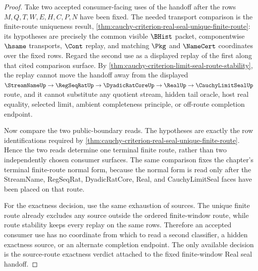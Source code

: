\begin{proof}
Take two accepted consumer-facing uses of the handoff after the rows
$M,Q,T,W,E,H,C,P,N$ have been fixed. The needed transport comparison is the
finite-route uniqueness result, \autoref{thm:cauchy-criterion-real-seal-unique-finite-route}: its hypotheses are precisely the common visible $\BHist$ packet,
componentwise $\hsame$ transports, $\Cont$ replay, and matching $\Pkg$ and
$\NameCert$ coordinates over the fixed rows. Regard the second use as a
displayed replay of the first along that cited comparison surface. By
\autoref{thm:cauchy-criterion-limit-seal-route-stability}, the replay cannot
move the handoff away from the displayed
$\StreamNameUp \to \RegSeqRatUp \to \DyadicRatCoreUp \to \RealUp \to
\CauchyLimitSealUp$ route, and it cannot substitute any quotient stream,
hidden tail oracle, host real equality, selected limit, ambient completeness
principle, or off-route completion endpoint.

Now compare the two public-boundary reads. The hypotheses are exactly the row
identifications required by
\autoref{thm:cauchy-criterion-real-seal-unique-finite-route}. Hence the two
reads determine one terminal finite route, rather than two independently chosen
consumer surfaces. The same comparison fixes the chapter's terminal
finite-route normal form, because the normal form is read only after the
StreamName, RegSeqRat, DyadicRatCore, Real, and CauchyLimitSeal faces have been
placed on that route.

For the exactness decision, use the same exhaustion of sources. The unique
finite route already excludes any source outside the ordered finite-window
route, while route stability keeps every replay on the same rows. Therefore an
accepted consumer use has no coordinate from which to read a second classifier,
a hidden exactness source, or an alternate completion endpoint. The only
available decision is the source-route exactness verdict attached to the fixed
finite-window Real seal handoff.
\end{proof}
